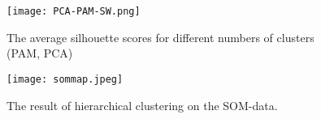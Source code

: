 \documentclass[11pt,twoside,swedish]{article}
\begin{document}
\begin{figure}
\centering
\texttt{[image: PCA-PAM-SW.png]}
\caption{The average silhouette scores for different numbers of
  clusters (PAM, PCA)}
\end{figure}

\begin{table}[ht]
\centering
{}
\caption{The result of PAM clustering on the PCA data.}
\end{table}

\begin{figure}[!ht]
\begin{center}
\texttt{[image: sommap.jpeg]}
\caption{The result of hierarchical clustering on the SOM-data.}
\label{mini 4 som}
\end{center}
\end{figure}

\newpage
\printbibliography
\end{document}

